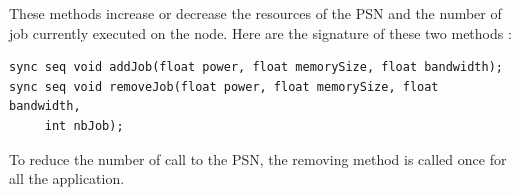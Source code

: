 These methods increase or decrease the resources of the PSN and the number of job currently executed on the node. Here are the signature of these two methods : \s
\begin{lstlisting}
sync seq void addJob(float power, float memorySize, float bandwidth);
sync seq void removeJob(float power, float memorySize, float bandwidth, 
     int nbJob);
\end{lstlisting}

To reduce the number of call to the PSN, the removing method is called once for all the application. 
